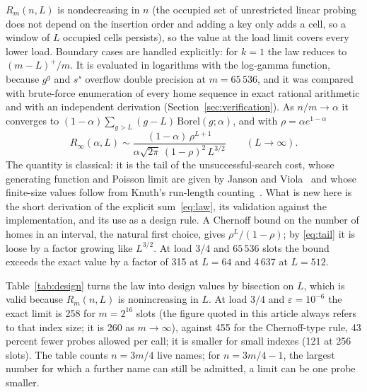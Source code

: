 $R_m(n,L)$ is nondecreasing in $n$ (the occupied set of unrestricted linear probing does not depend on the insertion order and adding a key only adds a cell, so a window of $L$ occupied cells persists), so the value at the load limit covers every lower load. Boundary cases are handled explicitly: for $k=1$ the law reduces to $(m-L)^{+}/m$. It is evaluated in logarithms with the log-gamma function, because $g^{g}$ and $s^{s}$ overflow double precision at $m=65\,536$, and it was compared with brute-force enumeration of every home sequence in exact rational arithmetic and with an independent derivation (Section~\ref{sec:verification}). As $n/m\to\alpha$ it converges to $(1-\alpha)\sum_{g>L}(g-L)\,\mathrm{Borel}(g;\alpha)$, and with $\rho=\alpha e^{1-\alpha}$
\begin{equation}
R_\infty(\alpha,L)\sim\frac{(1-\alpha)\,\rho^{L+1}}{\alpha\sqrt{2\pi}\,(1-\rho)^{2}\,L^{3/2}}\qquad(L\to\infty).
\label{eq:tail}
\end{equation}
The quantity is classical: it is the tail of the unsuccessful-search cost, whose generating function and Poisson limit are given by Janson and Viola~\cite{janson2016} and whose finite-size values follow from Knuth's run-length counting~\cite{knuth3}. What is new here is the short derivation of the explicit sum~\eqref{eq:law}, its validation against the implementation, and its use as a design rule. A Chernoff bound on the number of homes in an interval, the natural first choice, gives $\rho^{L}/(1-\rho)$; by \eqref{eq:tail} it is loose by a factor growing like $L^{3/2}$. At load $3/4$ and $65\,536$ slots the bound exceeds the exact value by a factor of 315 at $L=64$ and 4\,637 at $L=512$.


\begin{table}[t!]
\label{tab:design}
\centering
\setlength{\tabcolsep}{3pt}
\resizebox{\columnwidth}{!}{}
\end{table}

Table~\ref{tab:design} turns the law into design values by bisection on $L$, which is valid because $R_m(n,L)$ is nonincreasing in $L$. At load $3/4$ and $\varepsilon=10^{-6}$ the exact limit is 258 for $m=2^{16}$ slots (the figure quoted in this article always refers to that index size; it is 260 as $m\to\infty$), against 455 for the Chernoff-type rule, 43 percent fewer probes allowed per call; it is smaller for small indexes (121 at 256 slots). The table counts $n=3m/4$ live names; for $n=3m/4-1$, the largest number for which a further name can still be admitted, a limit can be one probe smaller.


